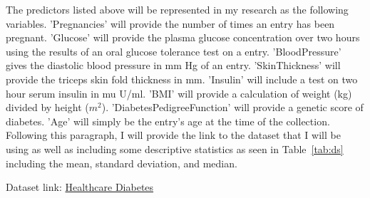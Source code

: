 \documentclass[12pt]{article}
\begin{document}
    \begin{table}[ht]
    \caption{Head of the Dataset}
    \centering
    \label{tab:head_of_data}
    \end{table}
    
    The predictors listed above will be represented in my research as the following variables. 'Pregnancies' will provide the number of 
    times an entry has been pregnant. 'Glucose' will provide the plasma glucose concentration over two hours using the results of an oral 
    glucose tolerance test on a entry. 'BloodPressure' gives the diastolic blood pressure in mm Hg of an entry. 'SkinThickness' will 
    provide the triceps skin fold thickness in mm. 'Insulin' will include a test on two hour serum insulin in mu U/ml. 'BMI' will provide a 
    calculation of weight (kg) divided by height ($m^2$). 'DiabetesPedigreeFunction' will provide a genetic score of diabetes. 'Age' will 
    simply be the entry's age at the time of the collection. Following this paragraph, I will provide the link to the dataset that I will 
    be using as well as including some descriptive statistics as seen in Table~\ref{tab:ds} including the mean, standard deviation, and median.  

Dataset link: \href{https://www.kaggle.com/datasets/nanditapore/healthcare-diabetes}{Healthcare Diabetes}
\end{document}
